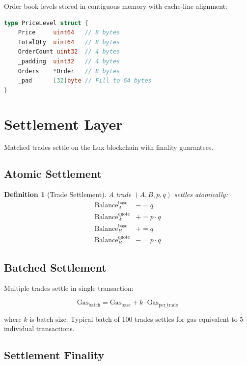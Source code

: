 \documentclass[11pt,a4paper]{article}
\newtheorem{definition}{Definition}
\begin{document}
Order book levels stored in contiguous memory with cache-line alignment:

\begin{lstlisting}[language=Go, caption=Cache-optimized price level]
type PriceLevel struct {
    Price     uint64   // 8 bytes
    TotalQty  uint64   // 8 bytes
    OrderCount uint32  // 4 bytes
    _padding  uint32   // 4 bytes
    Orders    *Order   // 8 bytes
    _pad      [32]byte // Fill to 64 bytes
}
\end{lstlisting}

\section{Settlement Layer}

Matched trades settle on the Lux blockchain with finality guarantees.

\subsection{Atomic Settlement}

\begin{definition}[Trade Settlement]
A trade $(A, B, p, q)$ settles atomically:
\begin{align}
    \text{Balance}_A^{\text{base}} &\mathrel{-}= q \\
    \text{Balance}_A^{\text{quote}} &\mathrel{+}= p \cdot q \\
    \text{Balance}_B^{\text{base}} &\mathrel{+}= q \\
    \text{Balance}_B^{\text{quote}} &\mathrel{-}= p \cdot q
\end{align}
\end{definition}

\subsection{Batched Settlement}

Multiple trades settle in single transaction:

\begin{equation}
    \text{Gas}_{\text{batch}} = \text{Gas}_{\text{base}} + k \cdot \text{Gas}_{\text{per\_trade}}
\end{equation}

where $k$ is batch size. Typical batch of 100 trades settles for gas equivalent to 5 individual transactions.

\subsection{Settlement Finality}
\end{document}
